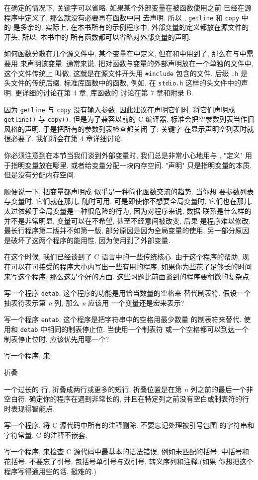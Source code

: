 在确定的情况下, \cextern 关键字可以省略. 如果某个外部变量在被函数使用之前
已经在源程序中定义了, 那么就没有必要再在函数中用 \cextern 去声明. 所以 
\cmain, \texttt{getline} 和 \texttt{copy} 中的 \cextern 是多余的. 实际上,
在本书所有的示例程序中, 外部变量的定义都放在源文件的开头, 所以, 本书中的
所有函数都可以省略对外部变量的声明.

如何函数分散在几个源文件中, 某个变量在中定义,
但在和中用到了,
那么在与中需要用 \cextern 来声明该变量.
通常来说, 把对函数与变量的外部声明放在一个单独的文件中, 这个文件传统上
叫做, 这就是在源文件开头用 \verb"#include" 包含的文件.
后缀 \texttt{.h} 是头文件的传统后缀. 标准库函数中的函数, 例如, 在
\texttt{stdio.h} 这样的头文件中的声明. 更详细的讨论在第 4 章, 库函数的
讨论在第 7 章和附录 B.

因为 \texttt{getline} 与 \texttt{copy} 没有输入参数, 因此建议在声明它们时,
将它们声明成 \texttt{getline()} 与 \texttt{copy()}. 但是为了兼容以前的 C
编译器, 标准会把空参数列表当作旧风格的声明, 于是把所有的参数列表检查都关闭
了; 关键字 \cvoid 在显示声明空列表时就很必要了. 我们将会在第 4 章详细讨论.

你必须注意到在本节当我们谈到外部变量时, 我们总是非常小心地用与%
, "定义" 用于指明变量放在哪里, 或者给变量分配一块内存空间.
"声明" 只是指明变量的本质, 但是没有分配内存空间.

顺便说一下, 把变量都声明成 \cextern 似乎是一种简化函数交流的趋势. 当你想
要参数列表与变量时, 它们就在那儿, 随时可用. 可是即使你不想要全局变量时, 
它们也在那儿. 太过依赖于全局变量是一种很危险的行为, 因为对程序来说, 数据
联系是什么样的并不是非常明显, 变量可以在不希望, 甚至不经意间被改变, 后果
是程序难以修改. 最长行程序第二版并不如第一版, 部分原因是因为全局变量的使用,
另一部分原因是破坏了这两个程序的能用性, 因为使用到了外部变量.

在这个时候, 我们已经谈到了 C 语言中的一些传统核心. 由于这个程序的帮助, 现
在可以在可接受的程序大小内写出一些有用的程序, 如果你为些花了足够长的时间
来写这个程序, 那么这是个好的方面. 这些习题比前面谈到的程序要稍微的复杂点.

\exercise 写一个程序 \texttt{detab}, 这个程序的功能是用恰当数量的空格来
替代制表符. 假设一个抽表符表示第 \textit{n} 列, 那么 \textit{n} 应该用
一个变量还是宏来表示?

\exercise 写一个程序 \texttt{entab}, 这个程序是把字符串中的空格用最少数量
的制表符来替代. 使用和 \texttt{detab} 中相同的制表停止位. 当使用一个制表符
或一个空格都可以到达一个制表停止位时, 应该优先用哪一个?

\exercise 写一个程序, 来\begin{myquotation}折叠\end{myquotation}一个过长的
行, 折叠成两行或更多的短行, 折叠位置是在第 \textit{n} 列之前的最后一个非
空白符. 确定你的程序在遇到非常长的, 并且在特定列之前没有空白或制表符的行
时表现得智能点.

\exercise 写一个程序, 将 C 源代码中所有的注释删除. 不要忘记处理被引号包围
的字符串和字符常量. C 的注释不嵌套.

\exercise 写一个程序, 来检查 C 源代码中最基本的语法错误, 例如未匹配的括号,
中括号和花括号. 不要忘了引号, 包括号单引号与双引号, 转义序列和注释.(如果 
你想把这个程序写得通用些的话, 挺难的.)

